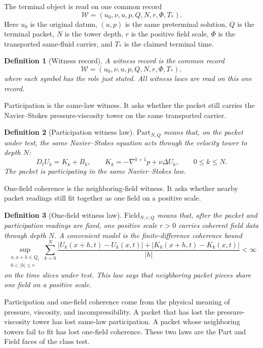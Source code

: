 \documentclass[11pt]{article}
\newtheorem{definition}{Definition}
\newcommand{\Part}{\mathrm{Part}}
\newcommand{\Field}{\mathrm{Field}}
\newcommand{\WitnessRecord}{\mathcal W}
\begin{document}
The terminal object is read on one common record
\[
  \WitnessRecord=(u_0,\nu,u,p,Q,N,r,\Phi,T_*).
\]
Here \(u_0\) is the original datum, \((u,p)\) is the same preterminal solution, \(Q\) is the terminal packet, \(N\) is the tower depth, \(r\) is the positive field scale, \(\Phi\) is the transported same-fluid carrier, and \(T_*\) is the claimed terminal time.

\begin{definition}[Witness record]
A witness record is the common record
\[
  \WitnessRecord=(u_0,\nu,u,p,Q,N,r,\Phi,T_*),
\]
where each symbol has the role just stated.
All witness laws are read on this one record.
\end{definition}

Participation is the same-law witness.
It asks whether the packet still carries the Navier--Stokes pressure-viscosity tower on the same transported carrier.

\begin{definition}[Participation witness law]
\(\Part_{N,Q}\) means that, on the packet under test, the same Navier--Stokes equation acts through the velocity tower to depth \(N\):
\[
  D_tU_k=K_k+B_k,
  \qquad
  K_k=-\nabla^{k+1}p+\nu\Delta U_k,
  \qquad 0\le k\le N.
\]
The packet is participating in the same Navier--Stokes law.
\end{definition}

One-field coherence is the neighboring-field witness.
It asks whether nearby packet readings still fit together as one field on a positive scale.

\begin{definition}[One-field witness law]
\(\Field_{N,r,Q}\) means that, after the packet and participation readings are fixed, one positive scale \(r>0\) carries coherent field data through depth \(N\).
A convenient model is the finite-difference coherence bound
\[
  \sup_{\substack{x,x+h\in Q_t\\0<|h|\le r}}
  \sum_{k=0}^{N}
  \frac{|U_k(x+h,t)-U_k(x,t)|+|K_k(x+h,t)-K_k(x,t)|}{|h|}<\infty
\]
on the time slices under test.
This law says that neighboring packet pieces share one field on a positive scale.
\end{definition}

Participation and one-field coherence come from the physical meaning of pressure, viscosity, and incompressibility.
A packet that has lost the pressure-viscosity tower has lost same-law participation.
A packet whose neighboring towers fail to fit has lost one-field coherence.
These two laws are the Part and Field faces of the class test.
\end{document}
